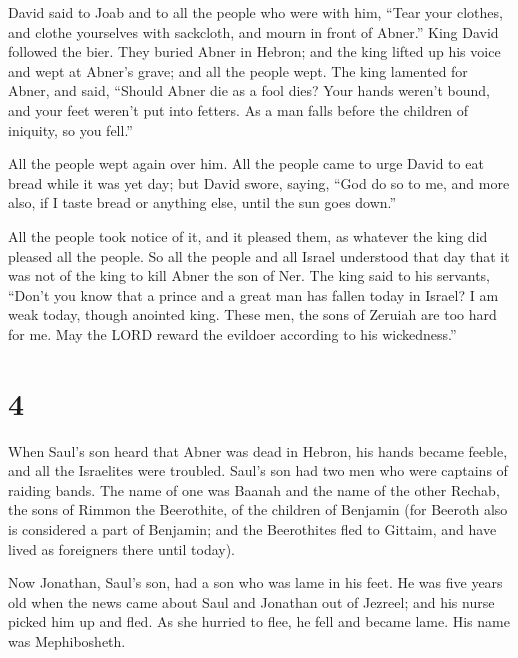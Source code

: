  David said to Joab and to all the people who were with
him, ``Tear your clothes, and clothe yourselves with sackcloth, and
mourn in front of Abner.'' King David followed the bier. 
They buried Abner in Hebron; and the king lifted up his voice and wept
at Abner's grave; and all the people wept.  The king
lamented for Abner, and said, ``Should Abner die as a fool dies?
 Your hands weren't bound, and your feet weren't put into
fetters. As a man falls before the children of iniquity, so you fell.''

All the people wept again over him.  All the people came
to urge David to eat bread while it was yet day; but David swore,
saying, ``God do so to me, and more also, if I taste bread or anything
else, until the sun goes down.''

 All the people took notice of it, and it pleased them,
as whatever the king did pleased all the people.  So all
the people and all Israel understood that day that it was not of the
king to kill Abner the son of Ner.  The king said to his
servants, ``Don't you know that a prince and a great man has fallen
today in Israel?  I am weak today, though anointed king.
These men, the sons of Zeruiah are too hard for me. May the LORD reward
the evildoer according to his wickedness.''

\hypertarget{section-3}{%
\section{4}\label{section-3}}

 When Saul's son heard that Abner was dead in Hebron, his
hands became feeble, and all the Israelites were troubled.
 Saul's son had two men who were captains of raiding
bands. The name of one was Baanah and the name of the other Rechab, the
sons of Rimmon the Beerothite, of the children of Benjamin (for Beeroth
also is considered a part of Benjamin;  and the
Beerothites fled to Gittaim, and have lived as foreigners there until
today).

 Now Jonathan, Saul's son, had a son who was lame in his
feet. He was five years old when the news came about Saul and Jonathan
out of Jezreel; and his nurse picked him up and fled. As she hurried to
flee, he fell and became lame. His name was Mephibosheth.

